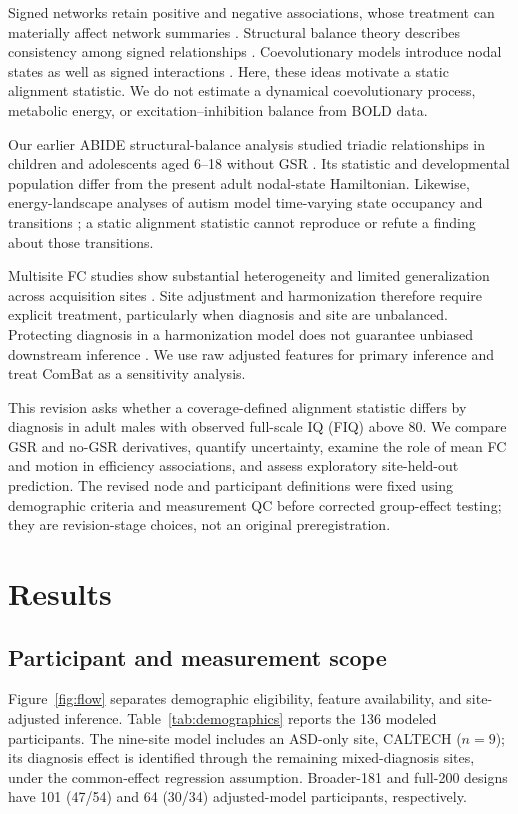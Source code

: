 \documentclass[10pt,letterpaper]{article}
\begin{document}
Signed networks retain positive and negative associations, whose treatment can
materially affect network summaries \cite{RubinovSporns2011}. Structural balance
theory describes consistency among signed relationships \cite{Heider:1946ac,cartwright1956}.
Coevolutionary models introduce nodal states as well as signed interactions
\cite{Kargaran:2021he,GhanbarzadehNoudehi2022}. Here, these ideas motivate a static
alignment statistic. We do not estimate a dynamical coevolutionary process,
metabolic energy, or excitation--inhibition balance from BOLD data.

Our earlier ABIDE structural-balance analysis studied triadic relationships in
children and adolescents aged 6--18 without GSR \cite{Moradimanesh2021}. Its
statistic and developmental population differ from the present adult nodal-state
Hamiltonian. Likewise, energy-landscape analyses of autism model time-varying
state occupancy and transitions \cite{Watanabe2017revision}; a static alignment
statistic cannot reproduce or refute a finding about those transitions.

Multisite FC studies show substantial heterogeneity and limited generalization
across acquisition sites \cite{King2019revision}. Site adjustment and harmonization
therefore require explicit treatment, particularly when diagnosis and site are
unbalanced. Protecting diagnosis in a harmonization model does not guarantee
unbiased downstream inference \cite{Nygaard2016revision}. We use raw adjusted
features for primary inference and treat ComBat as a sensitivity analysis.

This revision asks whether a coverage-defined alignment statistic differs by
diagnosis in adult males with observed full-scale IQ (FIQ) above 80. We compare
GSR and no-GSR derivatives, quantify uncertainty, examine the role of mean FC and
motion in efficiency associations, and assess exploratory site-held-out prediction.
The revised node and participant definitions were fixed using demographic criteria
and measurement QC before corrected group-effect testing; they are revision-stage
choices, not an original preregistration.

\section*{Results}
\subsection*{Participant and measurement scope}
Figure~\ref{fig:flow} separates demographic eligibility, feature availability, and
site-adjusted inference. Table~\ref{tab:demographics} reports the 136 modeled
participants. The nine-site model includes an ASD-only site, CALTECH ($n=9$);
its diagnosis effect is identified through the remaining mixed-diagnosis sites,
under the common-effect regression assumption. Broader-181 and full-200 designs
have 101 (47/54) and 64 (30/34) adjusted-model participants, respectively.
\end{document}
